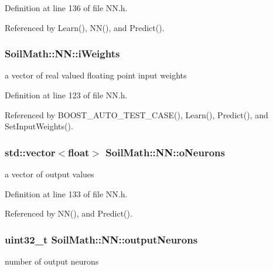 Definition at line 136 of file N\+N.\+h.



Referenced by Learn(), N\+N(), and Predict().

\hypertarget{class_soil_math_1_1_n_n_a96b0fe3caeed3d285204a6b4506075c9}{}
\subsubsection[{i\+Weights}]{ Soil\+Math\+::\+N\+N\+::i\+Weights}\label{class_soil_math_1_1_n_n_a96b0fe3caeed3d285204a6b4506075c9}
a vector of real valued floating point input weights 

Definition at line 123 of file N\+N.\+h.



Referenced by B\+O\+O\+S\+T\+\_\+\+A\+U\+T\+O\+\_\+\+T\+E\+S\+T\+\_\+\+C\+A\+S\+E(), Learn(), Predict(), and Set\+Input\+Weights().

\hypertarget{class_soil_math_1_1_n_n_a50a52b41982f6845dc5294f17607774b}{}
\subsubsection[{o\+Neurons}]{\setlength{\rightskip}{0pt plus 5cm}std\+::vector$<$float$>$ Soil\+Math\+::\+N\+N\+::o\+Neurons\hspace{0.3cm}{\ttfamily [private]}}\label{class_soil_math_1_1_n_n_a50a52b41982f6845dc5294f17607774b}
a vector of output values 

Definition at line 133 of file N\+N.\+h.



Referenced by N\+N(), and Predict().

\hypertarget{class_soil_math_1_1_n_n_a65ce6c65168fbe7051c25dccf4bf2b0c}{}
\subsubsection[{output\+Neurons}]{\setlength{\rightskip}{0pt plus 5cm}uint32\+\_\+t Soil\+Math\+::\+N\+N\+::output\+Neurons\hspace{0.3cm}{\ttfamily [private]}}\label{class_soil_math_1_1_n_n_a65ce6c65168fbe7051c25dccf4bf2b0c}
number of output neurons 

